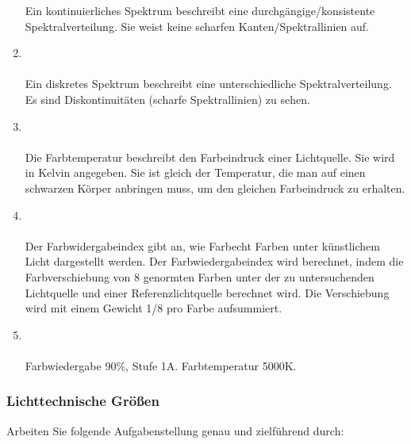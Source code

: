\begin{enumerate}
            Ein kontinuierliches Spektrum beschreibt eine durchgängige/konsistente Spektralverteilung. Sie weist keine scharfen Kanten/Spektrallinien auf.
    \item   {} \\\\
            Ein diskretes Spektrum beschreibt eine unterschiedliche Spektralverteilung. Es sind Diskontinuitäten (scharfe Spektrallinien) zu sehen.
    \item   {}\\\\
            Die Farbtemperatur beschreibt den Farbeindruck einer Lichtquelle. Sie wird in Kelvin angegeben. Sie ist gleich der Temperatur, die man 
            auf einen schwarzen Körper anbringen muss, um den gleichen Farbeindruck zu erhalten.
    \item   {}\\\\
            Der Farbwidergabeindex gibt an, wie Farbecht Farben unter künstlichem Licht dargestellt werden. Der Farbwiedergabeindex 
            wird berechnet, indem die Farbverschiebung von 8 genormten Farben unter der zu untersuchenden Lichtquelle und einer Referenzlichtquelle 
            berechnet wird. Die Verschiebung wird mit einem Gewicht 1/8 pro Farbe aufsummiert.
    \item   {}\\\\
            Farbwiedergabe 90\%, Stufe 1A. Farbtemperatur 5000K.
\end{enumerate}

\subsubsection{Lichttechnische Größen}
Arbeiten Sie folgende Aufgabenstellung genau und zielführend durch:

